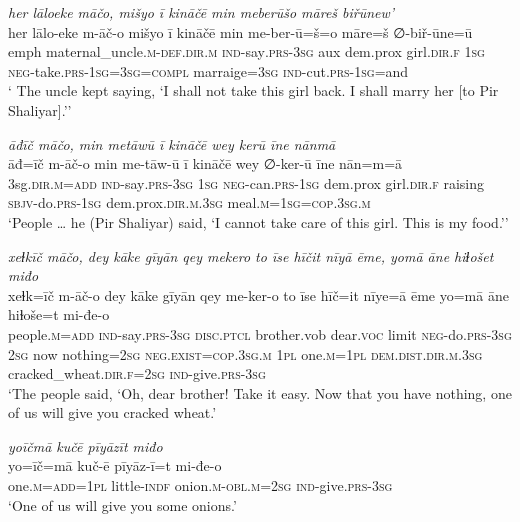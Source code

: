 \ea \label{ŽP.225}
\textit{her lāloeke māčo, mišyo ī kināčē min meberūšo māreš biřūnew’} \\ 
\gll her lālo-eke m-āč-o mišyo ī kināčē min me-ber-ū=š=o māre=š ∅-biř-ūne=ū \\ 
 emph maternal\_uncle\textsc{.m}\textsc{-def}\textsc{.dir}\textsc{.m} \textsc{ind-}say\textsc{.prs}\textsc{-3sg} aux dem.prox girl\textsc{.dir}\textsc{.f} \textsc{1sg} \textsc{neg-}take\textsc{.prs}\textsc{-\textsc{1sg}}\textsc{=3sg}\textsc{=compl} marraige\textsc{=3sg} \textsc{ind-}cut\textsc{.prs}\textsc{-\textsc{1sg}}=and \\ 
\glt ` The uncle kept saying, ‘I shall not take this girl back. I shall marry her [to Pir Shaliyar].’'
\z 
 
\ea \label{ŽP.226}
\textit{āđīč māčo, min metāwū ī kināčē wey kerū īne nānmā} \\ 
\gll āđ=īč m-āč-o min me-tāw-ū ī kināčē wey ∅-ker-ū īne nān=m=ā \\ 
 3sg\textsc{.dir}\textsc{.m}\textsc{=add} \textsc{ind-}say\textsc{.prs}\textsc{-3sg} \textsc{1sg} \textsc{neg-}can\textsc{.prs}\textsc{-\textsc{1sg}} dem.prox girl\textsc{.dir}\textsc{.f} raising \textsc{sbjv-}do\textsc{.prs}\textsc{-\textsc{1sg}} dem.prox\textsc{.dir}\textsc{.m}\textsc{.3sg} meal\textsc{.m}\textsc{=\textsc{1sg}}\textsc{=cop}\textsc{.3sg}\textsc{.m} \\ 
\glt `People … he (Pir Shaliyar) said, ‘I cannot take care of this girl. This is my food.’'
\z 
 
\ea \label{ŽP.227}
\textit{xeɫkīč māčo, dey kāke gīyān qey mekero to īse hīčit nīyā ēme, yomā āne hiɫošet miđo} \\ 
\gll xeɫk=īč m-āč-o dey kāke gīyān qey me-ker-o to īse hīč=it nīye=ā ēme yo=mā āne hiɫoše=t mi-đe-o \\ 
 people\textsc{.m}\textsc{=add} \textsc{ind-}say\textsc{.prs}\textsc{-3sg} \textsc{disc.ptcl} brother.vob dear.\textsc{voc} limit \textsc{neg-}do\textsc{.prs}\textsc{-3sg} \textsc{2sg} now nothing\textsc{=\textsc{2sg}} \textsc{\textsc{neg.}exist}\textsc{=cop}\textsc{.3sg}\textsc{.m} \textsc{1pl} one\textsc{.m}\textsc{=1pl} \textsc{dem.dist}\textsc{.dir}\textsc{.m}\textsc{.3sg} cracked\_wheat\textsc{.dir}\textsc{.f}\textsc{=\textsc{2sg}} \textsc{ind-}give\textsc{.prs}\textsc{-3sg} \\ 
\glt `The people said, ‘Oh, dear brother! Take it easy. Now that you have nothing, one of us will give you cracked wheat.'
\z 
 
\ea \label{ŽP.229}
\textit{yoīčmā kučē pīyāzīt miđo} \\ 
\gll yo=īč=mā kuč-ē pīyāz-ī=t mi-đe-o \\ 
 one\textsc{.m}\textsc{=add}\textsc{=1pl} little\textsc{-indf} onion\textsc{.m}\textsc{-obl}\textsc{.m}\textsc{=\textsc{2sg}} \textsc{ind-}give\textsc{.prs}\textsc{-3sg} \\ 
\glt `One of us will give you some onions.'
\z 
 

